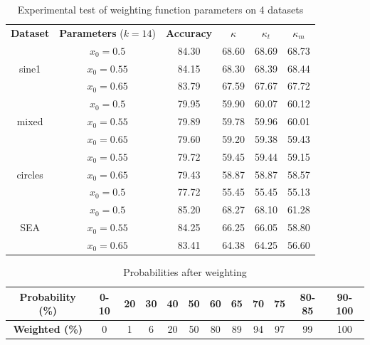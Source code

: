 \begin{table}
\caption{\label{table:weighting_experimental_test_all_datasets}Experimental test of weighting function parameters on 4 datasets}
\centering
\begin{tabular}{|c|c|c|c|c|c|}
\hline
\textbf{Dataset} & \textbf{Parameters} ($k=14$) & \textbf{Accuracy} & \textbf{$\kappa$} & \textbf{$\kappa_t$} & \textbf{$\kappa_m$} \\ \hhline{======}
& $x_0=0.5$    &    84.30    &    68.60    &    68.69    &    68.73\\ \cline{2-6}
sine1 & $x_0=0.55$    &    84.15    &    68.30    &    68.39    &    68.44\\ \cline{2-6}
 & $x_0=0.65$    &    83.79    &    67.59    &    67.67    &    67.72\\ \hhline{======}
 & $x_0=0.5$    &    79.95    &    59.90    &    60.07    &    60.12\\ \cline{2-6}
mixed & $x_0=0.55$    &    79.89    &    59.78    &    59.96    &    60.01\\ \cline{2-6}
 & $x_0=0.65$    &    79.60    &    59.20    &    59.38    &    59.43\\ \hhline{======}
 & $x_0=0.55$    &    79.72    &    59.45    &    59.44    &    59.15\\ \cline{2-6}
circles & $x_0=0.65$    &    79.43    &    58.87    &    58.87    &    58.57\\ \cline{2-6}
 & $x_0=0.5$    &    77.72    &    55.45    &    55.45    &    55.13\\ \hhline{======}
 & $x_0=0.5$    &    85.20    &    68.27    &    68.10    &    61.28\\ \cline{2-6}
SEA & $x_0=0.55$    &    84.25    &    66.25    &    66.05    &    58.80\\ \cline{2-6}
 & $x_0=0.65$    &    83.41    &    64.38    &    64.25    &    56.60\\ \hline
\end{tabular}
\end{table}

\begin{table}[]
\caption{\label{table:weight_probabilities}Probabilities after weighting}
\centering
\begin{tabular}{|c|c|c|c|c|c|c|c|c|c|c|c|} \hline
\textbf{Probability (\%)} & 0-10&20&30&40&50&60&65&70&75&80-85&90-100 \\ \hline
\textbf{Weighted (\%)} & 0&1&6&20&50&80&89&94&97&99&100 \\ \hline
\end{tabular}
\end{table}

